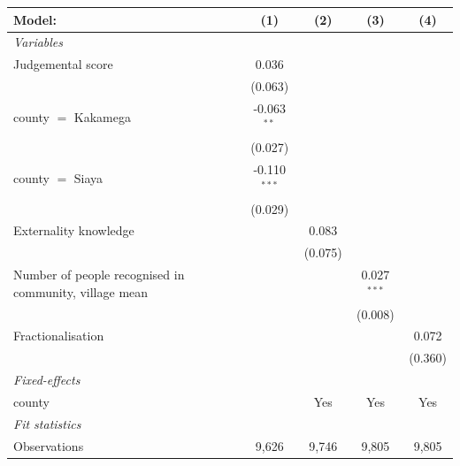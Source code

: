 \documentclass[
]{article}
\begin{document}
\begin{table}[htbp]

\begingroup
\centering
\begin{tabular}{lcccc}
   \tabularnewline \midrule \midrule
   Model:                                                 & (1)            & (2)     & (3)           & (4)\\  
   \midrule
   \emph{Variables}\\
   Judgemental score                                      & 0.036          &         &               &   \\   
                                                          & (0.063)        &         &               &   \\   
   county $=$ Kakamega                                    & -0.063$^{**}$  &         &               &   \\   
                                                          & (0.027)        &         &               &   \\   
   county $=$ Siaya                                       & -0.110$^{***}$ &         &               &   \\   
                                                          & (0.029)        &         &               &   \\   
   Externality knowledge                                  &                & 0.083   &               &   \\   
                                                          &                & (0.075) &               &   \\   
   Number of people recognised in community, village mean &                &         & 0.027$^{***}$ &   \\   
                                                          &                &         & (0.008)       &   \\   
   Fractionalisation                                      &                &         &               & 0.072\\   
                                                          &                &         &               & (0.360)\\   
   \midrule
   \emph{Fixed-effects}\\
   county                                                 &                & Yes     & Yes           & Yes\\  
   \midrule
   \emph{Fit statistics}\\
   Observations                                           & 9,626          & 9,746   & 9,805         & 9,805\\  

\end{tabular}
\end{table}
\end{document}
